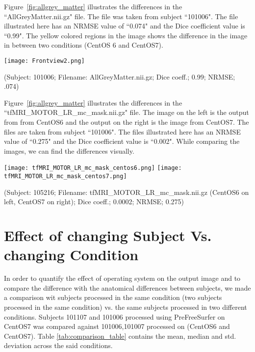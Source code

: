 Figure~\ref{fig:allgrey_matter} illustrates the differences in the ``AllGreyMatter.nii.gz" file. The file was taken from subject ``101006". The file illustrated here has an NRMSE value of ``0.074" and the Dice coefficient value is ``0.99". The yellow colored regions in the image shows the difference in the image in between two conditions (CentOS 6 and CentOS7).
\hfill \break
\begin{center}
\texttt{[image: Frontview2.png]}%
\caption*{(Subject: 101006; Filename: AllGreyMatter.nii.gz; Dice coeff.; 0.99; NRMSE; .074)}
\label{fig:allgrey_matter} 
\end{center}
\hfill \break

Figure~\ref{fig:allgrey_matter} illustrates the differences in the ``tfMRI\_MOTOR\_LR\_mc\_mask.nii.gz" file. The image on the left is the output from from CentOS6 and the output on the right is the image from CentOS7. The files are taken from subject ``101006". The files illustrated here has an NRMSE value of ``0.275" and the Dice coefficient value is ``0.002". While comparing the images, we can find the differences visually.

\hfill \break
\begin{center}
\texttt{[image: tfMRI\_MOTOR\_LR\_mc\_mask\_centos6.png]}%
\texttt{[image: tfMRI\_MOTOR\_LR\_mc\_mask\_centos7.png]}
\caption*{(Subject: 105216; Filename: tfMRI\_MOTOR\_LR\_mc\_mask.nii.gz (CentOS6 on left, CentOS7 on right); Dice coeff.; 0.0002; NRMSE; 0.275)}
\label{fig:tfMRI_mask_file}
\end{center}

\section{Effect of changing Subject Vs. changing Condition}\label{sec:comparison}
In order to quantify the effect of operating system on the output image and to compare the difference with the anatomical differences between subjects, we made a comparison wit subjects processed in the same condition (two subjects processed in the same condition) vs. the same subjects processed in two different conditions. Subjects 101107 and 101006 processed using PreFreeSurfer on CentOS7 was compared against 101006,101007 processed on (CentOS6 and CentOS7). Table \ref{tab:comparison_table} contains the mean, median and std. deviation across the said conditions.

